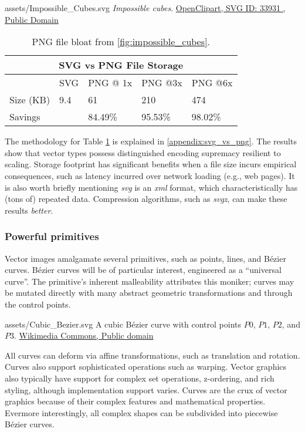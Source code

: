 \svg
{assets/Impossible_Cubes.svg}
{\label{fig:impossible_cubes}\textit{Impossible cubes}.}
{\href{https://freesvg.org/by/OpenClipart}{OpenClipart, SVG ID: 33931 , Public Domain}}\medskip

\begin{table}[H]
\centering
\begin{tabular}{ |p{2cm}||p{2cm}|p{2cm}|p{2cm}|p{2cm}|  }
\hline
\multicolumn{5}{|c|}{SVG vs PNG File Storage} \\
\hline
&SVG&PNG @ 1x&PNG @3x&PNG @6x\\
\hline
Size (KB)&9.4&61&210&474\\
\hline
Savings&&84.49\%&95.53\%&98.02\%\\
\hline
\end{tabular}
\caption{\label{tab:impossible_cubes_stats}PNG file bloat from \cref{fig:impossible_cubes}.}
\end{table}
\medskip

The methodology for Table \cref{tab:impossible_cubes_stats} is explained in \cref{appendix:svg_vs_png}. The results show that vector types possess distinguished encoding supremacy resilient to scaling. Storage footprint has significant benefits when a file size incurs empirical consequences, such as latency incurred over network loading (e.g., web pages). It is also worth briefly mentioning \textit{svg} is an \textit{xml} format, which characteristically has (tons of) repeated data. Compression algorithms, such as \textit{svgz}, can make these results \emph{better}.

\subsubsection{Powerful primitives}
Vector images amalgamate several primitives, such as points, lines, and Bézier curves. Bézier curves will be of particular interest, engineered as a ``universal curve''. The primitive's inherent malleability attributes this moniker; curves may be mutated directly with many abstract geometric transformations and through the control points.\medskip

\svg
{assets/Cubic_Bezier.svg}
{A cubic Bézier curve with control points \(P0\), \(P1\), \(P2\), and \(P3\).}
{\href{https://commons.wikimedia.org/wiki/File:Bezier_curve.svg}{Wikimedia Commons, Public domain}}
\label{fig:cubic_bezier_curve}\medskip

All curves can deform via affine transformations, such as translation and rotation. Curves also support sophisticated operations such as warping. Vector graphics also typically have support for complex set operations, z-ordering, and rich styling\cite{Barr84}, although implementation support varies. Curves are the crux of vector graphics because of their complex features and mathematical properties. Evermore interestingly, all complex shapes can be subdivided into piecewise Bézier curves.\medskip


